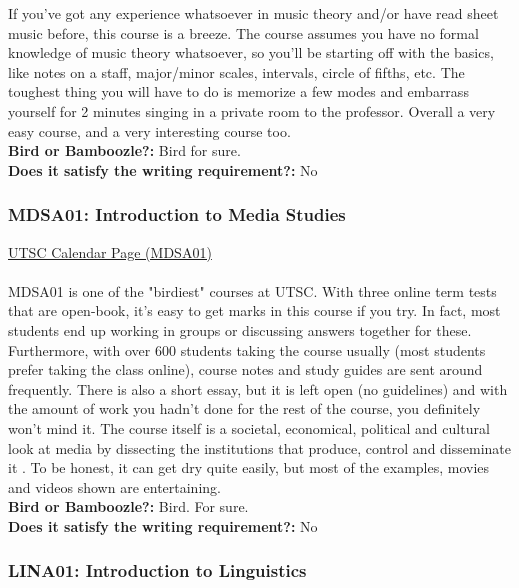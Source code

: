 \documentclass[11pt]{article}
\begin{document}
If you've got any experience whatsoever in music theory and/or have
read sheet music before, this course is a breeze. The course assumes
you have no formal knowledge of music theory whatsoever, so you'll be
starting off with the basics, like notes on a staff, major/minor scales,
intervals, circle of fifths, etc. The toughest thing you will have to do
is memorize a few modes and embarrass yourself for 2 minutes singing in
a private room to the professor. Overall a very easy course, and a very
interesting course too.\\

\textbf{Bird or Bamboozle?:} Bird for sure.\\

\textbf{Does it satisfy the writing requirement?:} No

\subsubsection{MDSA01: Introduction to Media Studies}
\href{https://utsc.calendar.utoronto.ca/course/MDSA01H3}{UTSC Calendar Page 
(MDSA01)}\\\\
MDSA01 is one of the "birdiest" courses at UTSC. With three online term
tests that are open-book, it's easy to get marks in this course if you
try. In fact, most students end up working in groups or discussing
answers together for these. Furthermore, with over 600 students taking
the course usually (most students prefer taking the class online),
course notes and study guides are sent around frequently. There is also
a short essay, but it is left open (no guidelines) and with the amount
of work you hadn't done for the rest of the course, you definitely
won't mind it. The course itself is a societal, economical, political
and cultural look at media by dissecting the institutions that produce,
control and disseminate it . To be honest, it can get dry quite easily,
but most of the examples, movies and videos shown are entertaining.\\

\textbf{Bird or Bamboozle?:} Bird. For sure.\\

\textbf{Does it satisfy the writing requirement?:} No

\subsubsection{LINA01: Introduction to Linguistics}
\end{document}
